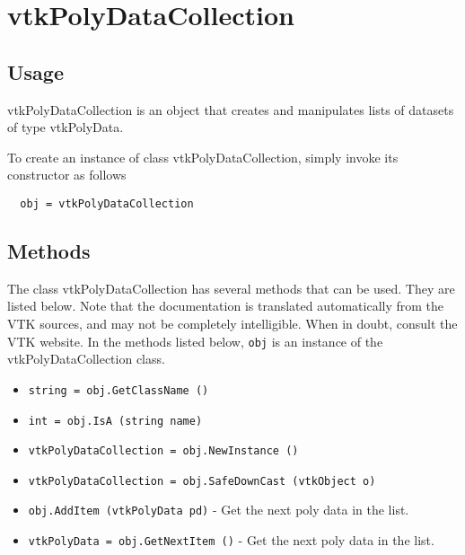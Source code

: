 \section{vtkPolyDataCollection}

\subsection{Usage}

 vtkPolyDataCollection is an object that creates and manipulates lists of
 datasets of type vtkPolyData. 

To create an instance of class vtkPolyDataCollection, simply
invoke its constructor as follows
\begin{verbatim}
  obj = vtkPolyDataCollection
\end{verbatim}
\subsection{Methods}

The class vtkPolyDataCollection has several methods that can be used.
  They are listed below.
Note that the documentation is translated automatically from the VTK sources,
and may not be completely intelligible.  When in doubt, consult the VTK website.
In the methods listed below, \verb|obj| is an instance of the vtkPolyDataCollection class.
\begin{itemize}
\item  \verb|string = obj.GetClassName ()|

\item  \verb|int = obj.IsA (string name)|

\item  \verb|vtkPolyDataCollection = obj.NewInstance ()|

\item  \verb|vtkPolyDataCollection = obj.SafeDownCast (vtkObject o)|

\item  \verb|obj.AddItem (vtkPolyData pd)| -  Get the next poly data in the list.

\item  \verb|vtkPolyData = obj.GetNextItem ()| -  Get the next poly data in the list.

\end{itemize}

